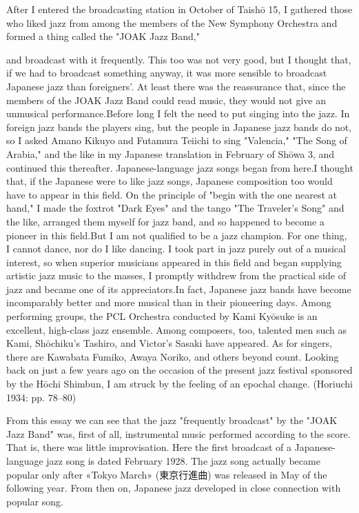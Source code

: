 \begin{gquote}
After I entered the broadcasting station in October of Taishō 15, I gathered those who liked jazz from among the members of the New Symphony Orchestra and formed a thing called the "JOAK Jazz Band,"
\end{gquote}

\begin{gquote}
and broadcast with it frequently. This too was not very good, but I thought that, if we had to broadcast something anyway, it was more sensible to broadcast Japanese jazz than foreigners'. At least there was the reassurance that, since the members of the JOAK Jazz Band could read music, they would not give an unmusical performance.Before long I felt the need to put singing into the jazz. In foreign jazz bands the players sing, but the people in Japanese jazz bands do not, so I asked Amano Kikuyo and Futamura Teiichi to sing "Valencia," "The Song of Arabia," and the like in my Japanese translation in February of Shōwa 3, and continued this thereafter. Japanese-language jazz songs began from here.I thought that, if the Japanese were to like jazz songs, Japanese composition too would have to appear in this field. On the principle of "begin with the one nearest at hand," I made the foxtrot "Dark Eyes" and the tango "The Traveler's Song" and the like, arranged them myself for jazz band, and so happened to become a pioneer in this field.But I am not qualified to be a jazz champion. For one thing, I cannot dance, nor do I like dancing. I took part in jazz purely out of a musical interest, so when superior musicians appeared in this field and began supplying artistic jazz music to the masses, I promptly withdrew from the practical side of jazz and became one of its appreciators.In fact, Japanese jazz bands have become incomparably better and more musical than in their pioneering days. Among performing groups, the PCL Orchestra conducted by Kami Kyōsuke is an excellent, high-class jazz ensemble. Among composers, too, talented men such as Kami, Shōchiku's Tashiro, and Victor's Sasaki have appeared. As for singers, there are Kawabata Fumiko, Awaya Noriko, and others beyond count. Looking back on just a few years ago on the occasion of the present jazz festival sponsored by the Hōchi Shimbun, I am struck by the feeling of an epochal change. (Horiuchi 1934: pp. 78–80)
\end{gquote}

From this essay we can see that the jazz "frequently broadcast" by the "JOAK Jazz Band" was, first of all, instrumental music performed according to the score. That is, there was little improvisation. Here the first broadcast of a Japanese-language jazz song is dated February 1928. The jazz song actually became popular only after «Tokyo March» (東京行進曲) was released in May of the following year. From then on, Japanese jazz developed in close connection with popular song.

